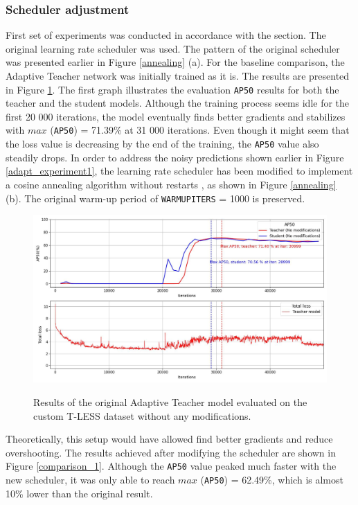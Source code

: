 \subsubsection{Scheduler adjustment}
\label{scheduler_section} 
First set of experiments was conducted in accordance with the  section. The original learning rate scheduler was used. The pattern of the original scheduler was presented earlier in Figure \ref{annealing} (a). For the  baseline comparison, the Adaptive Teacher network was initially trained as it is. The results are presented in Figure \ref{original_experiment}. The first graph illustrates the evaluation \texttt{AP50} results for both the teacher and the student models. Although the training process seems idle for the first 20 000 iterations, the model eventually finds better gradients and stabilizes with $max$ (\texttt{AP50}) = 71.39\% at 31 000 iterations. Even though it might seem that the loss value is decreasing by the end of the training, the \texttt{AP50} value also steadily drops. In order to address the noisy predictions shown earlier in Figure \ref{adapt_experiment1}, the learning rate scheduler has been modified to implement a cosine annealing algorithm without restarts \cite{Loshchilov2016}, as shown in Figure \ref{annealing} (b). The original warm-up period of \texttt{WARMUP\textunderscore ITERS} = 1000 is preserved. 

\begin{figure}[htb]
	\begin{center}
		\includegraphics[width=16cm]{./loss&AP50_original.jpg}
	\end{center}
	\caption{Results of the original Adaptive Teacher model evaluated on the custom T-LESS dataset without any modifications.}
	\begin{center}
		\label{original_experiment}
	\end{center}
\end{figure}
Theoretically, this setup would have allowed find better gradients and reduce overshooting. The results achieved after modifying the scheduler are shown in Figure \ref{comparison_1}. Although the \texttt{AP50} value peaked much faster with the new scheduler, it was only able to reach $max$ (\texttt{AP50}) = 62.49\%, which is almost 10\% lower than the original result.   

